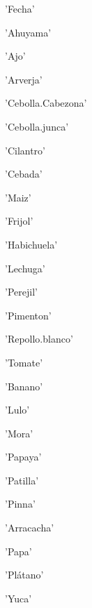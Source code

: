 \documentclass[11pt]{article}
\begin{document}
    \begin{enumerate*}
\item 'Fecha'
\item 'Ahuyama'
\item 'Ajo'
\item 'Arverja'
\item 'Cebolla.Cabezona'
\item 'Cebolla.junca'
\item 'Cilantro'
\item 'Cebada'
\item 'Maiz'
\item 'Frijol'
\item 'Habichuela'
\item 'Lechuga'
\item 'Perejil'
\item 'Pimenton'
\item 'Repollo.blanco'
\item 'Tomate'
\item 'Banano'
\item 'Lulo'
\item 'Mora'
\item 'Papaya'
\item 'Patilla'
\item 'Pinna'
\item 'Arracacha'
\item 'Papa'
\item 'Plátano'
\item 'Yuca'
\end{enumerate*}


    

    
    
    
    
\end{document}

